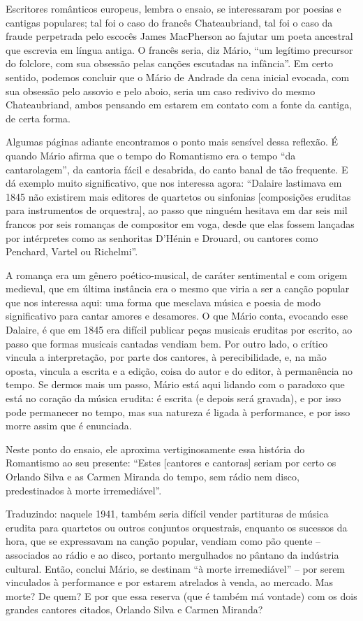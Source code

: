 Escritores românticos europeus, lembra o ensaio, se interessaram por
poesias e cantigas populares; tal foi o caso do francês Chateaubriand,
tal foi o caso da fraude perpetrada pelo escocês James MacPherson ao
fajutar um poeta ancestral que escrevia em língua antiga. O francês
seria, diz Mário, ``um legítimo precursor do folclore, com sua obsessão
pelas canções escutadas na infância''. Em certo sentido, podemos
concluir que o Mário de Andrade da cena inicial evocada, com sua
obsessão pelo assovio e pelo aboio, seria um caso redivivo do mesmo
Chateaubriand, ambos pensando em estarem em contato com a fonte da
cantiga, de certa forma.

Algumas páginas adiante encontramos o ponto mais sensível dessa
reflexão. É quando Mário afirma que o tempo do Romantismo era o tempo
``da cantarolagem'', da cantoria fácil e desabrida, do canto banal de
tão frequente. E dá exemplo muito significativo, que nos interessa
agora: ``Dalaire lastimava em 1845 não existirem mais editores de
quartetos ou sinfonias {[}composições eruditas para instrumentos de
orquestra{]}, ao passo que ninguém hesitava em dar seis mil francos por
seis romanças de compositor em voga, desde que elas fossem lançadas por
intérpretes como as senhoritas D'Hénin e Drouard, ou cantores como
Penchard, Vartel ou Richelmi''.

A romança era um gênero poético-musical, de caráter sentimental e com
origem medieval, que em última instância era o mesmo que viria a ser a
canção popular que nos interessa aqui: uma forma que mesclava música e
poesia de modo significativo para cantar amores e desamores. O que Mário
conta, evocando esse Dalaire, é que em 1845 era difícil publicar peças
musicais eruditas por escrito, ao passo que formas musicais cantadas
vendiam bem. Por outro lado, o crítico vincula a interpretação, por
parte dos cantores, à perecibilidade, e, na mão oposta, vincula a
escrita e a edição, coisa do autor e do editor, à permanência no tempo.
Se dermos mais um passo, Mário está aqui lidando com o paradoxo que está
no coração da música erudita: é escrita (e depois será gravada), e por
isso pode permanecer no tempo, mas sua natureza é ligada à performance,
e por isso morre assim que é enunciada.

Neste ponto do ensaio, ele aproxima vertiginosamente essa história do
Romantismo ao seu presente: ``Estes {[}cantores e cantoras{]} seriam por
certo os Orlando Silva e as Carmen Miranda do tempo, sem rádio nem
disco, predestinados à morte irremediável''.

Traduzindo: naquele 1941, também seria difícil vender partituras de
música erudita para quartetos ou outros conjuntos orquestrais, enquanto
os sucessos da hora, que se expressavam na canção popular, vendiam como
pão quente -- associados ao rádio e ao disco, portanto mergulhados no
pântano da indústria cultural. Então, conclui Mário, se destinam ``à
morte irremediável'' -- por serem vinculados à performance e por estarem
atrelados à venda, ao mercado. Mas morte? De quem? E por que essa
reserva (que é também má vontade) com os dois grandes cantores citados,
Orlando Silva e Carmen Miranda?


